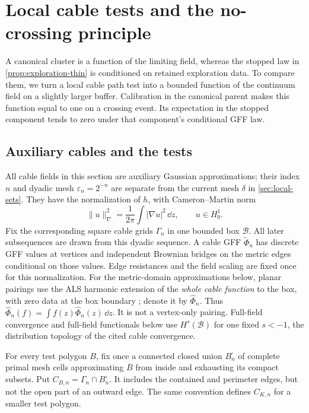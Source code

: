 \section{Local cable tests and the no-crossing principle}
\label{sec:local-kernel}

A canonical cluster is a function of the limiting field, whereas the
stopped law in \cref{prop:exploration-thin} is conditioned on retained
exploration data. To compare them, we turn a local cable path test into
a bounded function of the continuum field on a slightly larger buffer.
Calibration in the canonical parent makes this function equal to one
on a crossing event. Its expectation in the stopped component tends to
zero under that component's conditional GFF law.

\subsection{Auxiliary cables and the tests}

All cable fields in this section are auxiliary Gaussian approximations;
their index \(n\) and dyadic mesh \(\varepsilon_n=2^{-n}\) are separate from
the current mesh \(\delta\) in \cref{sec:local-sets}. They have the
normalization of \(h\), with Cameron--Martin norm
\begin{equation}
 \|u\|_{\nabla}^{2}=\frac1{2\pi}\int |\nabla u|^{2}\,\dd z,
 \qquad u\in H^1_0.
 \label{eq:kernel-energy}
\end{equation}
Fix the corresponding square cable grids \(\Gamma_n\) in one bounded
box \(\mathcal B\). All later subsequences are drawn from this dyadic
sequence. A cable GFF
\(\widetilde\Phi_n\) has discrete GFF values at vertices and independent
Brownian bridges on the metric edges conditional on those values. Edge
resistances and the field scaling are fixed once for this normalization.
For the metric-domain approximations below, planar pairings use the ALS harmonic extension of the
\emph{whole cable function} to the box, with zero data at the box boundary
\cite[Sections~2.1 and~4.1]{ALS2018}; denote it by
\(\widehat\Phi_n\). Thus
\(\widehat\Phi_n(f)=\int f(z)\widehat\Phi_n(z)\,\dd z\).
It is not a vertex-only pairing.
Full-field convergence and full-field functionals below use
\(H^s(\mathcal B)\) for one fixed \(s<-1\), the distribution topology
of the cited cable convergence.

For every test polygon \(B\), fix once a connected closed union
\(B_n^\square\) of complete primal mesh cells approximating
\(\overline B\) from inside and exhausting its compact subsets. Put
\(C_{B,n}=\Gamma_n\cap B_n^\square\). It includes the contained and
perimeter edges, but not the open part of an outward edge. The same
convention defines \(C_{K,n}\) for a smaller test polygon.

